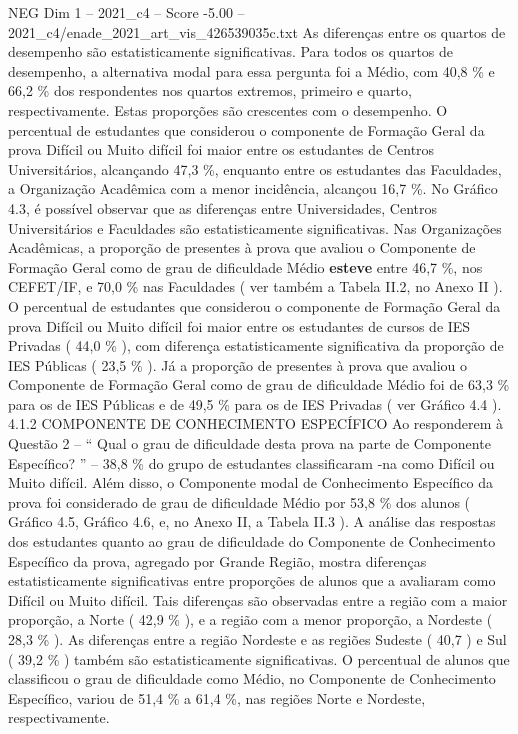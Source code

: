 \begin{textsample}{NEG Dim 1 – 2021\_c4 – Score -5.00 – 2021\_c4/enade\_2021\_art\_vis\_426539035c.txt}
As diferenças entre os quartos de desempenho são estatisticamente significativas.
Para todos os quartos de desempenho, a alternativa modal para essa pergunta foi a Médio, com 40,8 \% e 66,2 \% dos respondentes nos quartos extremos, primeiro e quarto, respectivamente.
Estas proporções são crescentes com o desempenho.
O percentual de estudantes que considerou o componente de Formação Geral da prova Difícil ou Muito difícil foi maior entre os estudantes de Centros Universitários, alcançando 47,3 \%, enquanto entre os estudantes das Faculdades, a Organização Acadêmica com a menor incidência, alcançou 16,7 \%.
No Gráfico 4.3, é possível observar que as diferenças entre Universidades, Centros Universitários e Faculdades são estatisticamente significativas.
Nas Organizações Acadêmicas, a proporção de presentes à prova que avaliou o Componente de Formação Geral como de grau de dificuldade Médio \textbf{esteve} entre 46,7 \%, nos CEFET/IF, e 70,0 \% nas Faculdades ( ver também a Tabela II.2, no Anexo II ).
O percentual de estudantes que considerou o componente de Formação Geral da prova Difícil ou Muito difícil foi maior entre os estudantes de cursos de IES Privadas ( 44,0 \% ), com diferença estatisticamente significativa da proporção de IES Públicas ( 23,5 \% ).
Já a proporção de presentes à prova que avaliou o Componente de Formação Geral como de grau de dificuldade Médio foi de 63,3 \% para os de IES Públicas e de 49,5 \% para os de IES Privadas ( ver Gráfico 4.4 ). 4.1.2 COMPONENTE DE CONHECIMENTO ESPECÍFICO Ao responderem à Questão 2 – “ Qual o grau de dificuldade desta prova na parte de Componente Específico? ” – 38,8 \% do grupo de estudantes classificaram -na como Difícil ou Muito difícil.
Além disso, o Componente modal de Conhecimento Específico da prova foi considerado de grau de dificuldade Médio por 53,8 \% dos alunos ( Gráfico 4.5, Gráfico 4.6, e, no Anexo II, a Tabela II.3 ).
A análise das respostas dos estudantes quanto ao grau de dificuldade do Componente de Conhecimento Específico da prova, agregado por Grande Região, mostra diferenças estatisticamente significativas entre proporções de alunos que a avaliaram como Difícil ou Muito difícil.
Tais diferenças são observadas entre a região com a maior proporção, a Norte ( 42,9 \% ), e a região com a menor proporção, a Nordeste ( 28,3 \% ).
As diferenças entre a região Nordeste e as regiões Sudeste ( 40,7 ) e Sul ( 39,2 \% ) também são estatisticamente significativas.
O percentual de alunos que classificou o grau de dificuldade como Médio, no Componente de Conhecimento Específico, variou de 51,4 \% a 61,4 \%, nas regiões Norte e Nordeste, respectivamente.

\end{textsample}
